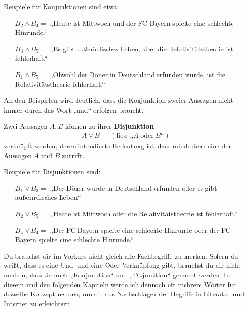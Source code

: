 \begin{bsp}
    Beispiele für Konjunktionen sind etwa:
    \begin{itemize}[labelindent=1.5em, leftmargin=!, labelwidth=]
        \item[$B_2\land B_4 =$] „Heute ist Mittwoch und der FC Bayern spielte eine schlechte Hinrunde.“
        \item[$B_3\land B_5 =$] „Es gibt außerirdisches Leben, aber die Relativitätstheorie ist fehlerhaft.“
        \item[$B_1\land B_5 =$] „Obwohl der Döner in Deutschland erfunden wurde, ist die Relativitätstheorie fehlerhaft.“
    \end{itemize}
    An den Beispielen wird deutlich, dass die Konjunktion zweier Aussagen nicht immer durch das Wort „und“ erfolgen braucht.
\end{bsp}
	
	
\begin{defin} 
    Zwei Aussagen $A,B$ können zu ihrer \textbf{Disjunktion}
    \begin{align*}
        A\lor B && (\text{lies: „$A$ oder $B$“})
    \end{align*}
    verknüpft werden, deren intendierte Bedeutung ist, dass mindestens eine der Aussagen $A$ und $B$ zutrifft.
\end{defin}
    

\begin{bsp}
    Beispiele für Disjunktionen sind:
    \begin{itemize}[labelindent=1.5em, leftmargin=!, labelwidth=]
        \item[$B_1 \lor B_3 =$] „Der Döner wurde in Deutschland erfunden oder es gibt außerirdisches Leben.“
        \item[$B_2\lor B_5 =$] „Heute ist Mittwoch oder die Relativitätstheorie ist fehlerhaft.“
        \item[$B_4\lor B_4=$] „Der FC Bayern spielte eine schlechte Hinrunde oder der FC Bayern spielte eine schlechte Hinrunde.“
    \end{itemize}
\end{bsp}

		
\begin{bem}[Fachbegriffe]
    Du brauchst dir im Vorkurs nicht gleich alle Fachbegriffe zu merken. Sofern du weißt, dass es eine Und- und eine Oder-Verknüpfung gibt, brauchst du dir nicht merken, dass sie auch „Konjunktion“ und „Disjunktion“ genannt werden. In diesem und den folgenden Kapiteln werde ich dennoch oft mehrere Wörter für dasselbe Konzept nennen, um dir das Nachschlagen der Begriffe in Literatur und Internet zu erleichtern.
\end{bem}

